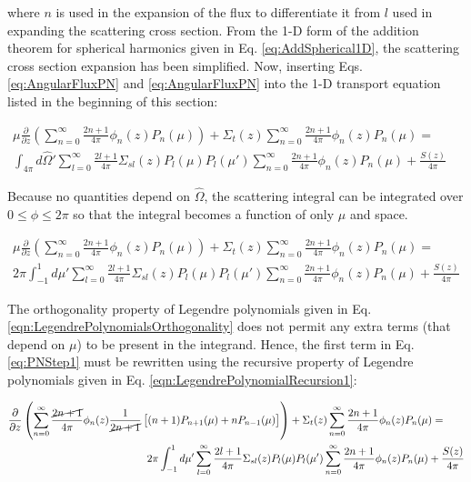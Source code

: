 \documentclass[10pt]{article}
\newcommand{\hO}{\hat{\Omega}}
\begin{document}
\begin{flushleft}
where \(n\) is used in the expansion of the flux to differentiate it from \(l\) used in expanding the scattering cross section. From the 1-D form of the addition theorem for spherical harmonics given in Eq. \eqref{eq:AddSpherical1D}, the scattering cross section expansion has been simplified. Now, inserting Eqs. \eqref{eq:AngularFluxPN} and \eqref{eq:AngularFluxPN} into the 1-D transport equation listed in the beginning of this section:

\begin{equation}
\begin{aligned}
\mu \frac{\partial}{\partial z}\left(\sum_{n=0}^{\infty}\frac{2n+1}{4\pi}\phi_n(z)P_n(\mu)\right) + \Sigma_t(z)\sum_{n=0}^{\infty}\frac{2n+1}{4\pi}\phi_n(z)P_n(\mu) =\quad\quad\\
\int_{4\pi}^{} d\hO  ' \sum_{l=0}^{\infty}\frac{2l+1}{4\pi}\Sigma_{sl}(z)P_l(\mu)P_l(\mu')\sum_{n=0}^{\infty}\frac{2n+1}{4\pi}\phi_n(z)P_n(\mu) + \frac{S(z)}{4\pi}
 \end{aligned}
 \end{equation}

Because no quantities depend on \(\hO  \), the scattering integral can be integrated over \(0\leq\phi\leq2\pi\) so that the integral becomes a function of only \(\mu\) and space.

\begin{equation}
\label{eq:PNStep1}
\begin{aligned}
\mu \frac{\partial}{\partial z}\left(\sum_{n=0}^{\infty}\frac{2n+1}{4\pi}\phi_n(z)P_n(\mu)\right) + \Sigma_t(z)\sum_{n=0}^{\infty}\frac{2n+1}{4\pi}\phi_n(z)P_n(\mu) =\quad\quad\\
2\pi\int_{-1}^{1} d\mu' \sum_{l=0}^{\infty}\frac{2l+1}{4\pi}\Sigma_{sl}(z)P_l(\mu)P_l(\mu')\sum_{n=0}^{\infty}\frac{2n+1}{4\pi}\phi_n(z)P_n(\mu) + \frac{S(z)}{4\pi}
 \end{aligned}
 \end{equation}
 
The orthogonality property of Legendre polynomials given in Eq. \eqref{eqn:LegendrePolynomialsOrthogonality} does not permit any extra terms (that depend on \(\mu\)) to be present in the integrand. Hence, the first term in Eq. \eqref{eq:PNStep1} must be rewritten using the recursive property of Legendre polynomials given in Eq. \eqref{eqn:LegendrePolynomialRecursion1}:

 \begin{equation}
\label{eq:PNStep2}
\begin{aligned}
\frac{\partial}{\partial z}\left(\sum_{n=0}^{\infty}\frac{\cancel{2n+1}}{4\pi}\phi_n(z)\frac{1}{\cancel{2n+1}} \left\lbrack(n+1)P_{n+1}(\mu) + n P_{n-1}(\mu)\right\rbrack\right) + \Sigma_t(z)\sum_{n=0}^{\infty}\frac{2n+1}{4\pi}\phi_n(z)P_n(\mu) =\quad\quad\\
2\pi\int_{-1}^{1} d\mu' \sum_{l=0}^{\infty}\frac{2l+1}{4\pi}\Sigma_{sl}(z)P_l(\mu)P_l(\mu')\sum_{n=0}^{\infty}\frac{2n+1}{4\pi}\phi_n(z)P_n(\mu) + \frac{S(z)}{4\pi}
 \end{aligned}
 \end{equation}
 

\end{flushleft}
\end{document}
